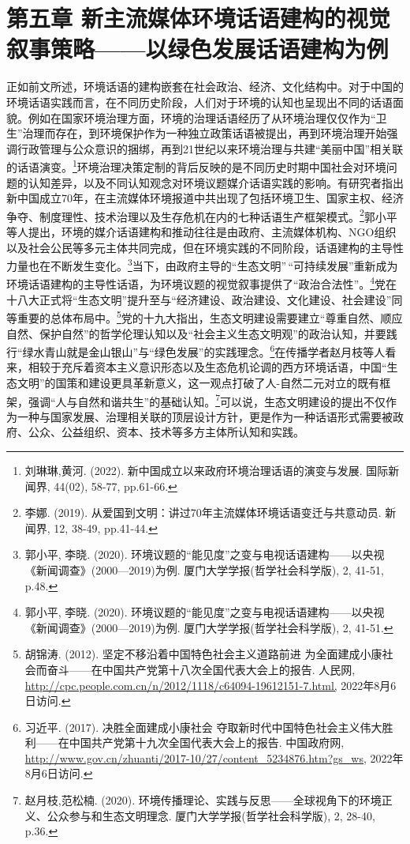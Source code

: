 \section{第五章
新主流媒体环境话语建构的视觉叙事策略------以绿色发展话语建构为例}\label{ux7b2cux4e94ux7ae0-ux65b0ux4e3bux6d41ux5a92ux4f53ux73afux5883ux8bddux8bedux5efaux6784ux7684ux89c6ux89c9ux53d9ux4e8bux7b56ux7565ux4ee5ux7effux8272ux53d1ux5c55ux8bddux8bedux5efaux6784ux4e3aux4f8b}

正如前文所述，环境话语的建构嵌套在社会政治、经济、文化结构中。对于中国的环境话语实践而言，在不同历史阶段，人们对于环境的认知也呈现出不同的话语面貌。例如在国家环境治理方面，环境的治理话语经历了从环境治理仅仅作为``卫生''治理而存在，到环境保护作为一种独立政策话语被提出，再到环境治理开始强调行政管理与公众意识的捆绑，再到21世纪以来环境治理与共建``美丽中国''相关联的话语演变。\footnote{刘琳琳,黄河.
  (2022). 新中国成立以来政府环境治理话语的演变与发展. 国际新闻界,
  44(02), 58-77, pp.61-66.}环境治理决策定制的背后反映的是不同历史时期中国社会对环境问题的认知差异，以及不同认知观念对环境议题媒介话语实践的影响。有研究者指出新中国成立70年，在主流媒体环境报道中共出现了包括环境卫生、国家主权、经济争夺、制度理性、技术治理以及生存危机在内的七种话语生产框架模式。\footnote{李娜.
  (2019). 从爱国到文明：讲过70年主流媒体环境话语变迁与共意动员. 新闻界,
  12, 38-49, pp.41-44.}郭小平等人提出，环境的媒介话语建构和推动往往是由政府、主流媒体机构、NGO组织以及社会公民等多元主体共同完成，但在环境实践的不同阶段，话语建构的主导性力量也在不断发生变化。\footnote{郭小平,
  李晓. (2020).
  环境议题的``能见度''之变与电视话语建构------以央视《新闻调查》(2000---2019)为例.
  厦门大学学报(哲学社会科学版), 2, 41-51, p.48.}当下，由政府主导的``生态文明''\,``可持续发展''重新成为环境话语建构的主导性话语，为环境议题的视觉叙事提供了``政治合法性''。\footnote{郭小平,
  李晓. (2020).
  环境议题的``能见度''之变与电视话语建构------以央视《新闻调查》(2000---2019)为例.
  厦门大学学报(哲学社会科学版), 2, 41-51.}党在十八大正式将``生态文明''提升至与``经济建设、政治建设、文化建设、社会建设''同等重要的总体布局中。\footnote{胡锦涛.
  (2012). 坚定不移沿着中国特色社会主义道路前进
  为全面建成小康社会而奋斗------在中国共产党第十八次全国代表大会上的报告.
  人民网,
  \url{http://cpc.people.com.cn/n/2012/1118/c64094-19612151-7.html,}
  2022年8月6日访问.}党的十九大指出，生态文明建设需要建立``尊重自然、顺应自然、保护自然''的哲学伦理认知以及``社会主义生态文明观''的政治认知，并要践行``绿水青山就是金山银山''与``绿色发展''的实践理念。\footnote{习近平.
  (2017). 决胜全面建成小康社会
  夺取新时代中国特色社会主义伟大胜利------在中国共产党第十九次全国代表大会上的报告.
  中国政府网,
  \url{http://www.gov.cn/zhuanti/2017-10/27/content_5234876.htm?gs_ws,}
  2022年8月6日访问.}在传播学者赵月枝等人看来，相较于充斥着资本主义意识形态以及生态危机论调的西方环境话语，中国``生态文明''的国策和建设更具革新意义，这一观点打破了人-自然二元对立的既有框架，强调``人与自然和谐共生''的基础认知。\footnote{赵月枝,范松楠.
  (2020).
  环境传播理论、实践与反思------全球视角下的环境正义、公众参与和生态文明理念.
  厦门大学学报(哲学社会科学版), 2, 28-40, p.36.}可以说，生态文明建设的提出不仅作为一种与国家发展、治理相关联的顶层设计方针，更是作为一种话语形式需要被政府、公众、公益组织、资本、技术等多方主体所认知和实践。

